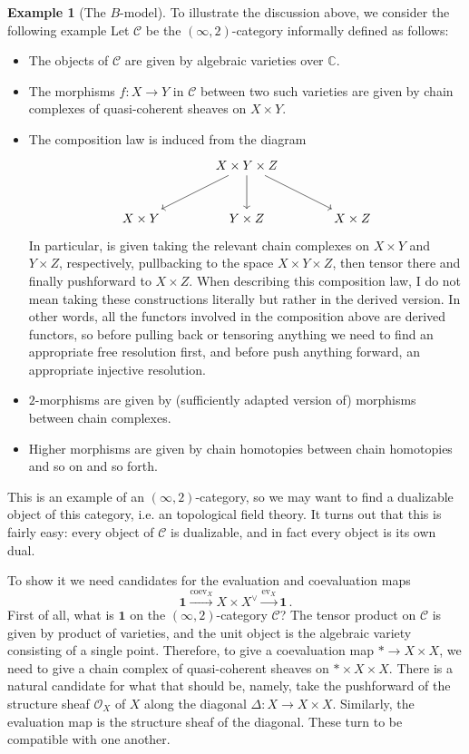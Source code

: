 \documentclass[a4paper,11pt]{article}
\newcommand{\ocal}{\mathscr{O}}
\newcommand{\ccal}{\mathcal{C}}
\theoremstyle{plain}
\theoremstyle{definition}
\newtheorem{ej}[thm]{Example}
\theoremstyle{remark}
\begin{document}
\begin{ej}[The $B$-model]
To illustrate the discussion above, we consider the following example Let $\ccal$ be the $(\infty, 2)$-category informally defined as follows: 
\begin{itemize}
    \item The objects of $\ccal$ are given by algebraic varieties over $\mathbb{C}$. 
    \item The morphisms $f \colon X \to Y$ in $\ccal$ between two such varieties are given by chain complexes of quasi-coherent sheaves on $X \times Y$. 
    \item The composition law is induced from the diagram 
    \begin{equation*}
        \begin{tikzcd}[row sep = large, column sep = large]
        & X \times Y \times Z \arrow[ld] \arrow[d] \arrow[rd] &\\
        X \times Y & Y \times Z & X \times Z
        \end{tikzcd}
    \end{equation*}
    In particular, is given taking the relevant chain complexes on $X \times Y$ and $Y \times Z$, respectively, pullbacking to the space $X \times Y \times Z$, then tensor there and finally pushforward to $X \times Z$. When describing this composition law, I do not mean taking these constructions literally but rather in the derived version. In other words, all the functors involved in the composition above are derived functors, so before pulling back or tensoring anything we need to find an appropriate free resolution first, and before push anything forward, an appropriate injective resolution. 
    \item $2$-morphisms are given by (sufficiently adapted version of) morphisms between chain complexes. 
    \item Higher morphisms are given by chain homotopies between chain homotopies and so on and so forth. 
\end{itemize}
This is an example of an $(\infty, 2)$-category, so we may want to find a dualizable object of this category, i.e. an topological field theory. It turns out that this is fairly easy: every object of $\ccal$ is dualizable, and in fact every object is its own dual. 

To show it we need candidates for the evaluation and coevaluation maps
$$\mathbf{1} \xrightarrow{\text{coev}_X} X \times X^{\lor} \xrightarrow{\text{ev}_X} \mathbf{1} \, .$$
First of all, what is $\mathbf{1}$ on the $(\infty, 2)$-category $\ccal$? The tensor product on $\ccal$ is given by product of varieties, and the unit object is the algebraic variety consisting of a single point. Therefore, to give a coevaluation map $* \to X \times X$, we need to give a chain complex of quasi-coherent sheaves on $* \times X \times X$. There is a natural candidate for what that should be, namely, take the pushforward of the structure sheaf $\ocal_X$ of $X$ along the diagonal $\Delta \colon X \to X \times X$. Similarly, the evaluation map is the structure sheaf of the diagonal. These turn to be compatible with one another.


\end{ej}
\end{document}
